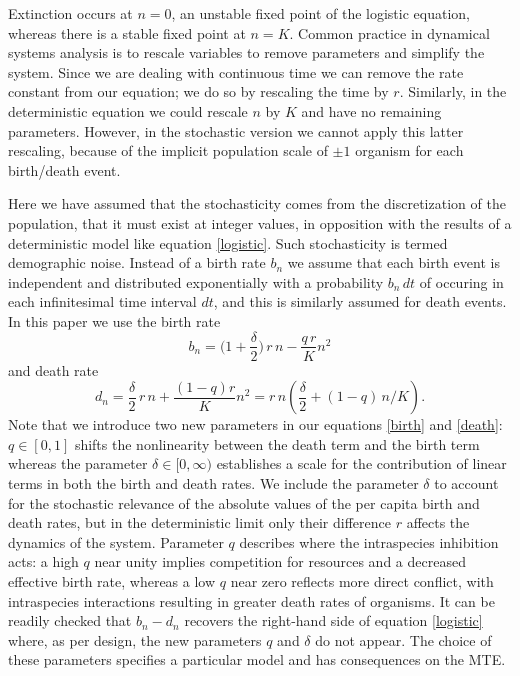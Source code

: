 \documentclass[a4paper,10pt]{article}
\numberwithin{equation}{section} %
\begin{document}
Extinction occurs at $n=0$, an unstable fixed point of the logistic equation, whereas there is a stable fixed point at $n=K$. 
Common practice in dynamical systems analysis is to rescale variables to remove parameters and simplify the system. 
Since we are dealing with continuous time we can remove the rate constant from our equation; we do so by rescaling the time by $r$. 
Similarly, in the deterministic equation we could rescale $n$ by $K$ and have no remaining parameters.
However, in the stochastic version we cannot apply this latter rescaling, because of the implicit population scale of $\pm1$ organism for each birth/death event. %

Here we have assumed that the stochasticity comes from the discretization of the population, that it must exist at integer values, in opposition with the results of a deterministic model like equation \ref{logistic}. 
Such stochasticity is termed demographic noise. 
Instead of a birth rate $b_n$ we assume that each birth event is independent and distributed exponentially with a probability $b_n\,dt$ of occuring in each infinitesimal time interval $dt$, and this is similarly assumed for death events. %
In this paper we use the birth rate
\begin{equation}
 b_n = \Big(1 + \frac{\delta}{2}\Big)\,r\,n - \frac{q\,r}{K}n^2%
\label{birth}
\end{equation}
and death rate
\begin{equation}
 d_n = \frac{\delta}{2}\,r\,n + \frac{(1-q)r}{K} n^2 = r\,n\left(\frac{\delta}{2}+(1-q)\,n/K\right).
\label{death}
\end{equation}
Note that we introduce two new parameters in our equations \ref{birth} and \ref{death}: $q\in[0,1]$ shifts the nonlinearity between the death term and the birth term whereas the parameter $\delta\in[0,\infty)$ establishes a scale for the contribution of linear terms in both the birth and death rates.
We include the parameter $\delta$ to account for the stochastic relevance of the absolute values of the per capita birth and death rates, but in the deterministic limit only their difference $r$ affects the dynamics of the system. 
Parameter $q$ describes where the intraspecies inhibition acts: a high $q$ near unity implies competition for resources and a decreased effective birth rate, whereas a low $q$ near zero reflects more direct conflict, with intraspecies interactions resulting in greater death rates of organisms. 
It can be readily checked that $b_n-d_n$ recovers the right-hand side of equation \ref{logistic} where, as per design, the new parameters $q$ and $\delta$ do not appear.
The choice of these parameters specifies a particular model and has consequences on the MTE. 
\end{document}
